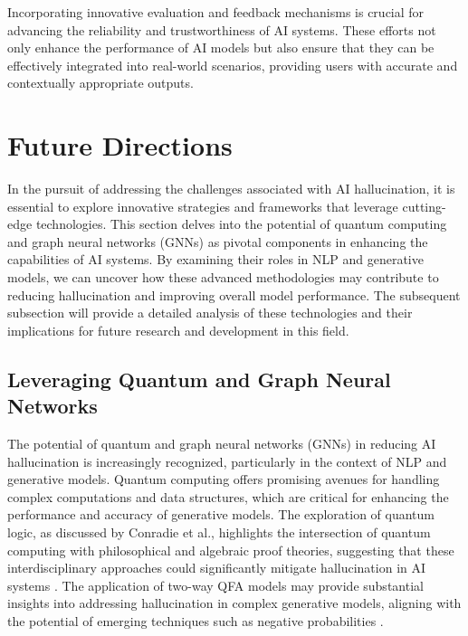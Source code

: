 Incorporating innovative evaluation and feedback mechanisms is crucial for advancing the reliability and trustworthiness of AI systems. These efforts not only enhance the performance of AI models but also ensure that they can be effectively integrated into real-world scenarios, providing users with accurate and contextually appropriate outputs.














\section{Future Directions} \label{sec:Future Directions}

In the pursuit of addressing the challenges associated with AI hallucination, it is essential to explore innovative strategies and frameworks that leverage cutting-edge technologies. This section delves into the potential of quantum computing and graph neural networks (GNNs) as pivotal components in enhancing the capabilities of AI systems. By examining their roles in NLP and generative models, we can uncover how these advanced methodologies may contribute to reducing hallucination and improving overall model performance. The subsequent subsection will provide a detailed analysis of these technologies and their implications for future research and development in this field.





\subsection{Leveraging Quantum and Graph Neural Networks} \label{subsec:Leveraging Quantum and Graph Neural Networks}

The potential of quantum and graph neural networks (GNNs) in reducing AI hallucination is increasingly recognized, particularly in the context of NLP and generative models. Quantum computing offers promising avenues for handling complex computations and data structures, which are critical for enhancing the performance and accuracy of generative models. The exploration of quantum logic, as discussed by Conradie et al., highlights the intersection of quantum computing with philosophical and algebraic proof theories, suggesting that these interdisciplinary approaches could significantly mitigate hallucination in AI systems \cite{conradie2021nondistributivelogicssemanticsmeaning}. The application of two-way QFA models may provide substantial insights into addressing hallucination in complex generative models, aligning with the potential of emerging techniques such as negative probabilities \cite{debarros2015examplescontextualityphysicsimplications}.



